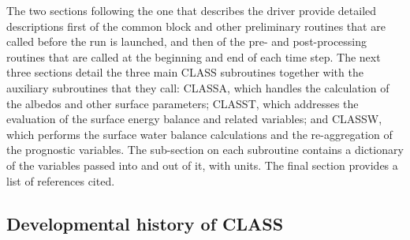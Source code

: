 The two sections following the one that describes the driver provide detailed descriptions first of the common block and other preliminary routines that are called before the run is launched, and then of the pre-\/ and post-\/processing routines that are called at the beginning and end of each time step. The next three sections detail the three main C\+L\+A\+S\+S subroutines together with the auxiliary subroutines that they call\+: C\+L\+A\+S\+S\+A, which handles the calculation of the albedos and other surface parameters; C\+L\+A\+S\+S\+T, which addresses the evaluation of the surface energy balance and related variables; and C\+L\+A\+S\+S\+W, which performs the surface water balance calculations and the re-\/aggregation of the prognostic variables. The sub-\/section on each subroutine contains a dictionary of the variables passed into and out of it, with units. The final section provides a list of references cited.\hypertarget{index_devHistory}{}\subsection{Developmental history of C\+L\+A\+S\+S}\label{index_devHistory}
